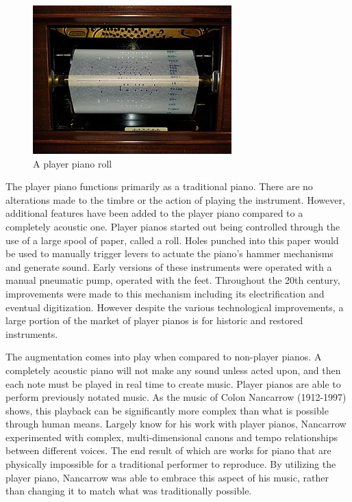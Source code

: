 \begin{figure}
    \centering
    \includegraphics[scale=0.8]{diagrams/PlayerPianoRoll.jpg}
    \caption{A player piano roll}
    \label{fig:pianoroll}
\end{figure}

The player piano functions primarily as a traditional piano. There are no alterations made to the timbre or the action of playing the instrument. However, additional features have been added to the player piano compared to a completely acoustic one. Player pianos started out being controlled through the use of a large spool of paper, called a roll. Holes punched into this paper would be used to manually trigger levers to actuate the piano's hammer mechanisms and generate sound. Early versions of these instruments were operated with a manual pneumatic pump, operated with the feet. Throughout the 20th century, improvements were made to this mechanism including its electrification and eventual digitization. However despite the various technological improvements, a large portion of the market of player pianos is for historic and restored instruments.

The augmentation comes into play when compared to non-player pianos. A completely acoustic piano will not make any sound unless acted upon, and then each note must be played in real time to create music. Player pianos are able to perform previously notated music. As the music of Colon Nancarrow (1912-1997) shows, this playback can be significantly more complex than what is possible through human means. Largely know for his work with player pianos, Nancarrow experimented with complex, multi-dimensional canons and tempo relationships between different voices. The end result of which are works for piano that are physically impossible for a traditional performer to reproduce. By utilizing the player piano, Nancarrow was able to embrace this aspect of his music, rather than changing it to match what was traditionally possible.

